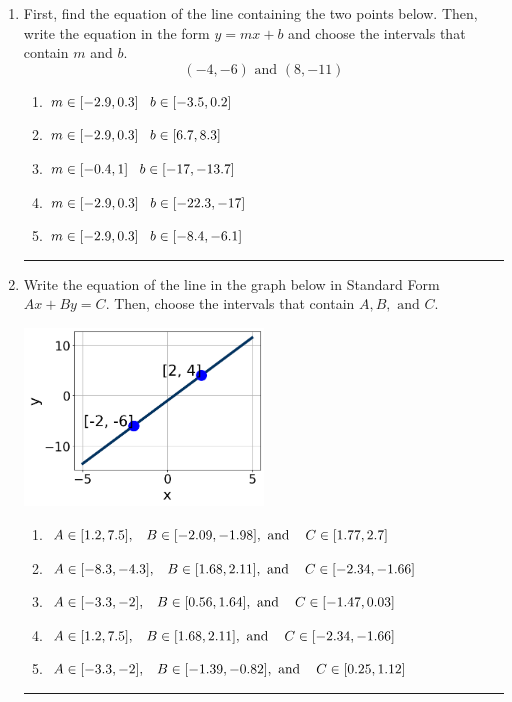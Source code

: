 \documentclass[14pt]{extbook}
\newcommand{\litem}[1]{\item#1\hspace*{-1cm}\rule{\textwidth}{0.4pt}}
\begin{document}
\begin{enumerate}
{\begin{enumerate}[label=\Alph*.]
\end{enumerate} }
\litem{
First, find the equation of the line containing the two points below. Then, write the equation in the form $ y=mx+b $ and choose the intervals that contain $m$ and $b$.\[ (-4, -6) \text{ and } (8, -11) \]\begin{enumerate}[label=\Alph*.]
\item \( m \in [-2.9, 0.3] \hspace*{3mm} b \in [-3.5, 0.2] \)
\item \( m \in [-2.9, 0.3] \hspace*{3mm} b \in [6.7, 8.3] \)
\item \( m \in [-0.4, 1] \hspace*{3mm} b \in [-17, -13.7] \)
\item \( m \in [-2.9, 0.3] \hspace*{3mm} b \in [-22.3, -17] \)
\item \( m \in [-2.9, 0.3] \hspace*{3mm} b \in [-8.4, -6.1] \)

\end{enumerate} }
\litem{
Write the equation of the line in the graph below in Standard Form $Ax+By=C$. Then, choose the intervals that contain $A, B, \text{ and } C$.
\begin{center}
    \includegraphics[width=0.5\textwidth]{../Figures/linearGraphToStandardB.png}
\end{center}
\begin{enumerate}[label=\Alph*.]
\item \( A \in [1.2, 7.5], \hspace{3mm} B \in [-2.09, -1.98], \text{ and } \hspace{3mm} C \in [1.77, 2.7] \)
\item \( A \in [-8.3, -4.3], \hspace{3mm} B \in [1.68, 2.11], \text{ and } \hspace{3mm} C \in [-2.34, -1.66] \)
\item \( A \in [-3.3, -2], \hspace{3mm} B \in [0.56, 1.64], \text{ and } \hspace{3mm} C \in [-1.47, 0.03] \)
\item \( A \in [1.2, 7.5], \hspace{3mm} B \in [1.68, 2.11], \text{ and } \hspace{3mm} C \in [-2.34, -1.66] \)
\item \( A \in [-3.3, -2], \hspace{3mm} B \in [-1.39, -0.82], \text{ and } \hspace{3mm} C \in [0.25, 1.12] \)


\end{enumerate}}
\end{enumerate}
\end{document}
